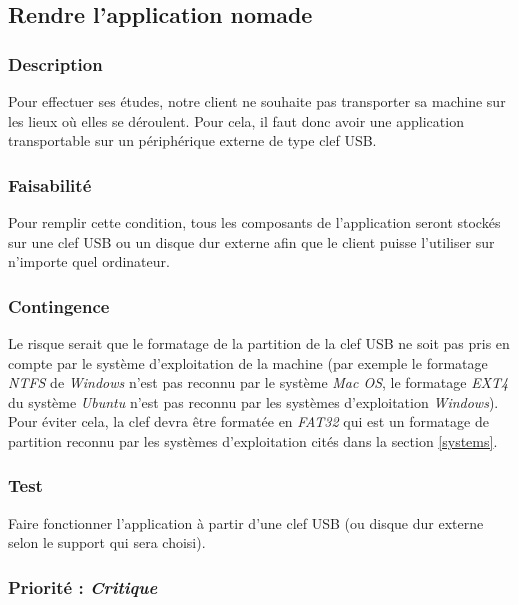 \subsection{Rendre l’application nomade}\label{nomadite}

\subsubsection{Description}
Pour effectuer ses études, notre client ne souhaite pas transporter sa machine sur les lieux où elles se déroulent. Pour cela, il faut donc avoir une application transportable sur un périphérique externe de type clef USB.

\subsubsection{Faisabilité}

Pour remplir cette condition, tous les composants de l’application seront stockés sur une clef USB ou un disque dur externe afin que le client puisse l'utiliser sur n’importe quel ordinateur.


\subsubsection{Contingence}

Le risque serait que le formatage de la partition de la clef USB ne soit pas pris en compte par le système d’exploitation de la machine (par exemple le formatage \textit{NTFS} de \textit{Windows} n’est pas reconnu par le système \textit{Mac OS}, le formatage \textit{EXT4} du système \textit{Ubuntu} n’est pas reconnu par les systèmes d’exploitation \textit{Windows}). Pour éviter cela, la clef devra être formatée en \textit{FAT32} qui est un formatage de partition reconnu par les systèmes d’exploitation cités dans la section \ref{systems}.

\subsubsection{Test}

Faire fonctionner l’application à partir d’une clef USB (ou disque dur externe selon le support qui sera choisi).

\subsubsection{Priorité : \textit{Critique}}

